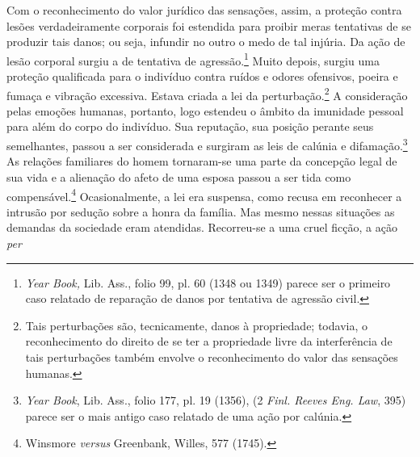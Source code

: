 Com o reconhecimento do valor jurídico das sensações, assim, a proteção
contra lesões verdadeiramente corporais foi estendida para proibir meras
tentativas de se produzir tais danos; ou seja, infundir no outro o medo
de tal injúria. Da ação de lesão corporal surgiu a de tentativa de
agressão.\footnote{\emph{Year Book,} Lib. Ass., folio 99, pl. 60 (1348
  ou 1349) parece ser o primeiro caso relatado de reparação de danos por
  tentativa de agressão civil.} Muito depois, surgiu uma proteção
qualificada para o indivíduo contra ruídos e odores ofensivos, poeira e
fumaça e vibração excessiva. Estava criada a lei da
perturbação.\footnote{Tais perturbações são, tecnicamente, danos à
  propriedade; todavia, o reconhecimento do direito de se ter a
  propriedade livre da interferência de tais perturbações também envolve
  o reconhecimento do valor das sensações humanas.} A consideração pelas
emoções humanas, portanto, logo estendeu o âmbito da imunidade pessoal
para além do corpo do indivíduo. Sua reputação, sua posição perante seus
semelhantes, passou a ser considerada e surgiram as leis de calúnia e
difamação.\footnote{\emph{Year Book}, Lib. Ass., folio 177, pl. 19
  (1356), (2 \emph{Finl. Reeves Eng. Law}, 395) parece ser o mais antigo
  caso relatado de uma ação por calúnia.} As relações familiares do
homem tornaram-se uma parte da concepção legal de sua vida e a alienação
do afeto de uma esposa passou a ser tida como compensável.\footnote{Winsmore
  \emph{versus} Greenbank, Willes, 577 (1745).} Ocasionalmente, a lei
era suspensa, como recusa em reconhecer a intrusão por sedução sobre a
honra da família. Mas mesmo nessas situações as demandas da sociedade
eram atendidas. Recorreu-se a uma cruel ficção, a ação \emph{per}

